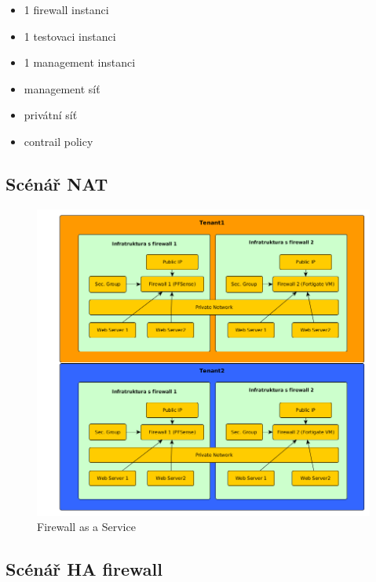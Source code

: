 \begin{itemize}
\item 1 firewall instanci
\item 1 testovaci instanci
\item 1 management instanci
\item management síť
\item privátní síť
\item contrail policy
\end{itemize}

\subsection{Scénář NAT}


\begin{figure}[h]
\begin{centering}
\includegraphics[scale=0.43]{images/firewall}
\par\end{centering}
\caption{Firewall as a Service\label{fig:firewall}}
\end{figure}

\subsection{Scénář HA firewall}

